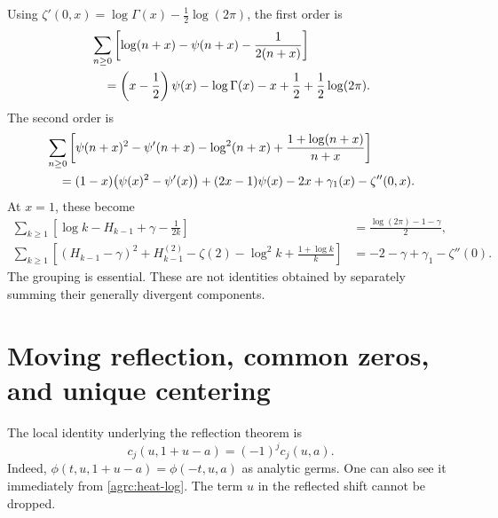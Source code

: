 Using $\zeta'(0,x)=\log\Gamma(x)-\tfrac12\log(2\pi)$, the first order is
\begin{align}
 &\sum_{n\geq0}\left[\log(n+x)-\psi(n+x)-\frac1{2(n+x)}\right]\notag\\
 &\quad=\left(x-\frac12\right)\psi(x)-\log\Gamma(x)-x
                         +\frac12+\frac12\log(2\pi).
 \label{agrc:first-log}
\end{align}
The second order is
\begin{align}
 &\sum_{n\geq0}\left[\psi(n+x)^2-\psi'(n+x)-\log^2(n+x)
                       +\frac{1+\log(n+x)}{n+x}\right]\notag\\
 &\quad=(1-x)\bigl(\psi(x)^2-\psi'(x)\bigr)
     +(2x-1)\psi(x)-2x+\gamma_1(x)-\zeta''(0,x).
 \label{agrc:second-log}
\end{align}
At $x=1$, these become
\begin{align}
 \sum_{k\geq1}\left[\log k-H_{k-1}+\gamma-\frac1{2k}\right]
 &=\frac{\log(2\pi)-1-\gamma}{2},\label{agrc:first-at-one}\\
 \sum_{k\geq1}\left[(H_{k-1}-\gamma)^2+H_{k-1}^{(2)}-\zeta(2)
            -\log^2 k+\frac{1+\log k}{k}\right]
 &=-2-\gamma+\gamma_1-\zeta''(0).
 \label{agrc:second-at-one}
\end{align}
The grouping is essential. These are not identities obtained by
separately summing their generally divergent components.

\section{Moving reflection, common zeros, and unique centering}
\label{agrc:reflection-section}

The local identity underlying the reflection theorem is
\begin{equation}\label{agrc:heat-reflection}
 c_j(u,1+u-a)=(-1)^jc_j(u,a).
\end{equation}
Indeed,
$\phi(t,u,1+u-a)=\phi(-t,u,a)$ as analytic germs. One can also see it
immediately from \eqref{agrc:heat-log}. The term $u$ in the reflected
shift cannot be dropped.

